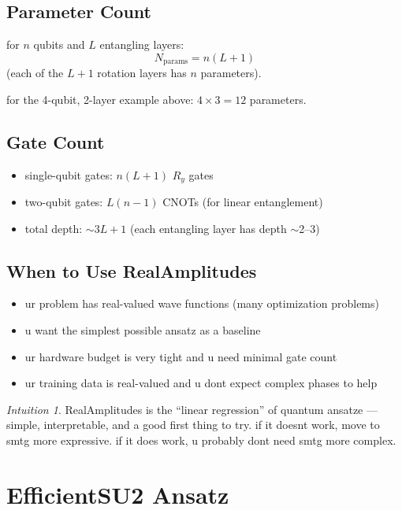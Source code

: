 \documentclass[11pt,a4paper]{article}
\theoremstyle{definition}
\theoremstyle{remark}
\newtheorem*{intuition}{Intuition}
\begin{document}
\subsection{Parameter Count}

for $n$ qubits and $L$ entangling layers:
\[
N_{\text{params}} = n(L + 1)
\]
(each of the $L+1$ rotation layers has $n$ parameters).

for the 4-qubit, 2-layer example above: $4 \times 3 = 12$ parameters.

\subsection{Gate Count}

\begin{itemize}[leftmargin=*]
    \item single-qubit gates: $n(L+1)$ $R_y$ gates
    \item two-qubit gates: $L(n-1)$ CNOTs (for linear entanglement)
    \item total depth: $\sim 3L + 1$ (each entangling layer has depth $\sim$2--3)
\end{itemize}

\subsection{When to Use RealAmplitudes}

\begin{itemize}[leftmargin=*]
    \item ur problem has real-valued wave functions (many optimization problems)
    \item u want the simplest possible ansatz as a baseline
    \item ur hardware budget is very tight and u need minimal gate count
    \item ur training data is real-valued and u dont expect complex phases to help
\end{itemize}

\begin{intuition}
RealAmplitudes is the ``linear regression'' of quantum ansatze --- simple, interpretable, and a good first thing to try. if it doesnt work, move to smtg more expressive. if it does work, u probably dont need smtg more complex.
\end{intuition}

\section{EfficientSU2 Ansatz}
\end{document}
